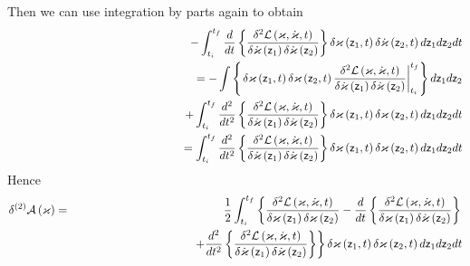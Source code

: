 Then we can use integration by parts again to obtain 
\begin{eqnarray}
&&-\int_{t_{i}}^{t_{f}}\frac{d}{dt}\left\{ \frac{\delta ^{2}{\cal L}\left(
\varkappa ,\dot{\varkappa},t\right) }{\delta \dot{\varkappa}\left( {\sf z}%
_{1}\right) \delta \dot{\varkappa}\left( {\sf z}_{2}\right) }\right\} \delta
\varkappa \left( {\sf z}_{1},t\right) \delta \dot{\varkappa}\left( {\sf z}%
_{2},t\right) d{\sf z}_{1}d{\sf z}_{2}dt  \nonumber \\
&&\left. {}\right. =-\int \left\{ \left. \delta \varkappa \left( {\sf z}%
_{1},t\right) \delta \varkappa \left( {\sf z}_{2},t\right) \frac{\delta ^{2}%
{\cal L}\left( {\cal \varkappa },{\cal \dot{\varkappa}},t\right) }{\delta 
\dot{\varkappa}\left( {\sf z}_{1}\right) \delta \dot{\varkappa}\left( {\sf z}%
_{2}\right) }\right| _{t_{i}}^{t_{f}}\right\} d{\sf z}_{1}d{\sf z}_{2} 
\nonumber \\
&&\qquad \qquad \qquad \qquad \qquad +\int_{t_{i}}^{t_{f}}\frac{d^{2}}{dt^{2}%
}\left\{ \frac{\delta ^{2}{\cal L}\left( \varkappa ,\dot{\varkappa},t\right) 
}{\delta \dot{\varkappa}\left( {\sf z}_{1}\right) \delta \dot{\varkappa}%
\left( {\sf z}_{2}\right) }\right\} \delta \varkappa \left( {\sf z}%
_{1},t\right) \delta \varkappa \left( {\sf z}_{2},t\right) d{\sf z}_{1}d{\sf %
z}_{2}dt  \nonumber \\
&&\left. {}\right. \qquad \qquad \qquad \qquad \qquad \qquad \qquad
=\int_{t_{i}}^{t_{f}}\frac{d^{2}}{dt^{2}}\left\{ \frac{\delta ^{2}{\cal L}%
\left( \varkappa ,\dot{\varkappa},t\right) }{\delta \dot{\varkappa}\left( 
{\sf z}_{1}\right) \delta \dot{\varkappa}\left( {\sf z}_{2}\right) }\right\}
\delta \varkappa \left( {\sf z}_{1},t\right) \delta \varkappa \left( {\sf z}%
_{2},t\right) d{\sf z}_{1}d{\sf z}_{2}dt
\end{eqnarray}%
Hence 
\begin{eqnarray}
\delta ^{\left( 2\right) }{\cal A}\left( \varkappa \right) &=&\frac{1}{2}%
\int_{t_{i}}^{t_{f}}\left\{ \frac{\delta ^{2}{\cal L}\left( {\cal \varkappa }%
,{\cal \dot{\varkappa}},t\right) }{\delta \varkappa \left( {\sf z}%
_{1}\right) \delta \varkappa \left( {\sf z}_{2}\right) }-\frac{d}{dt}\left\{ 
\frac{\delta ^{2}{\cal L}\left( \varkappa ,\dot{\varkappa},t\right) }{\delta
\varkappa \left( {\sf z}_{1}\right) \delta \dot{\varkappa}\left( {\sf z}%
_{2}\right) }\right\} \right.  \nonumber \\
&&\qquad \qquad \qquad \qquad \qquad \left. +\frac{d^{2}}{dt^{2}}\left\{ 
\frac{\delta ^{2}{\cal L}\left( \varkappa ,\dot{\varkappa},t\right) }{\delta 
\dot{\varkappa}\left( {\sf z}_{1}\right) \delta \dot{\varkappa}\left( {\sf z}%
_{2}\right) }\right\} \right\} \delta \varkappa \left( {\sf z}_{1},t\right)
\delta \varkappa \left( {\sf z}_{2},t\right) d{\sf z}_{1}d{\sf z}_{2}dt
\label{Avar2b}
\end{eqnarray}
